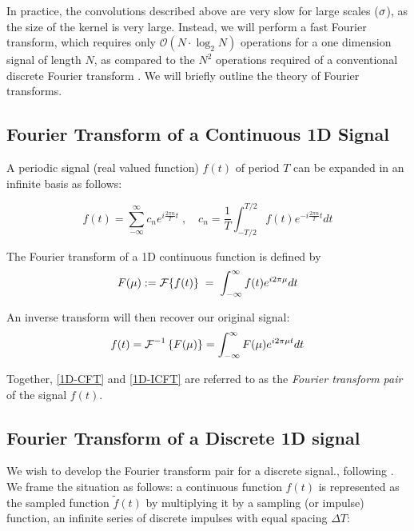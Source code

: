 In practice, the convolutions described above  are very slow for large scales ($\large \sigma$), as the size of the kernel is very large. Instead, we will perform a fast Fourier transform, which requires only $\mathscr{O}\left(N\cdot \log_2N\right)$ operations for a one dimension signal of length $N$, as compared to the $N^2$ operations required of a conventional discrete Fourier transform \cite{DIPGW}. We will briefly outline the theory of Fourier transforms.

\subsection{Fourier Transform of a Continuous 1D Signal}


A periodic signal (real valued function) $f(t)$ of period $T$ can  be expanded in an infinite basis as follows:

\begin{equation}
f(t) = \sum_{-\infty}^{\infty} c_n e^{i\frac{2\pi n}{T}t} \;,\quad
	c_n = \frac{1}{T}\int_{-T/2}^{T/2} f(t) e^{-i\frac{2\pi n}{T}t} dt
	\end{equation}

The Fourier transform of a 1D continuous function is defined by
\begin{equation} \label{1D-CFT}
F(\mu) := \operatorname{\mathcal{F}}\{f(t)\} \;=\; \int_{-\infty}^{\infty} f(t) e^{i2\pi \mu } dt
\end{equation}

An inverse transform will then recover our original signal:
\begin{equation} \label{1D-ICFT}
f(t) = \operatorname{\mathcal{F}}^{-1}\left\{F(\mu)\right\} = \int_{-\infty}^{\infty} F(\mu) e^{i2\pi \mu t} dt
\end{equation}

Together, \cref{1D-CFT} and \cref{1D-ICFT} are referred to as the \textit{Fourier transform pair} of the signal $f(t)$. 

\subsection{Fourier Transform of a Discrete 1D signal}

We wish to develop the Fourier transform pair for a discrete signal., following \cite{DIPGW}. We frame the situation
as follows: a continuous function $f(t)$ is represented as the sampled function $\tilde{f}(t)$ by multiplying it by a sampling (or impulse) function, an infinite series of discrete impulses with equal spacing $\Delta T$:

